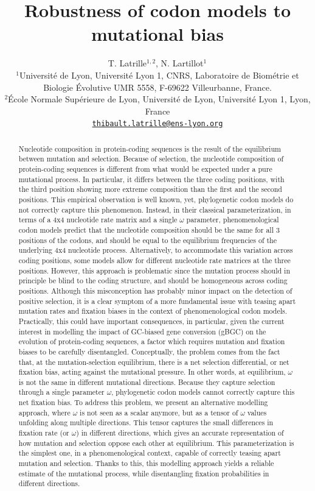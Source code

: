 \documentclass{article}
\title{Robustness of codon models to mutational bias}
\author{
    \large
    T. {Latrille}$^{1,2}$, N. {Lartillot}$^{1}$ \\
    \normalsize
	$^{1}$Université de Lyon, Université Lyon 1, CNRS, Laboratoire de Biométrie et Biologie Évolutive UMR 5558, F-69622 Villeurbanne, France.\\
	$^{2}$École Normale Supérieure de Lyon, Université de Lyon, Université Lyon 1, Lyon, France\\
	\texttt{\href{mailto:thibault.latrille@ens-lyon.org}{thibault.latrille@ens-lyon.org}} \\
}
\begin{document}
\maketitle

\begin{abstract}
    Nucleotide composition in protein-coding sequences is the result of the equilibrium between mutation and selection.
    Because of selection, the nucleotide composition of protein-coding sequences is different from what would be expected under a pure mutational process.
    In particular, it differs between the three coding positions, with the third position showing more extreme composition than the first and the second positions.
    This empirical observation is well known, yet, phylogenetic codon models do not correctly capture this phenomenon.
    Instead, in their classical parameterization, in terms of a 4x4 nucleotide rate matrix and a single $\omega$ parameter, phenomenological codon models predict that the nucleotide composition should be the same for all $3$ positions of the codons, and should be equal to the equilibrium frequencies of the underlying 4x4 nucleotide process.
    Alternatively, to accommodate this variation across coding positions, some models allow for different nucleotide rate matrices at the three positions.
    However, this approach is problematic since the mutation process should in principle be blind to the coding structure, and should be homogeneous across coding positions.
    Although this misconception has probably minor impact on the detection of positive selection, it is a clear symptom of a more fundamental issue with teasing apart mutation rates and fixation biases in the context of phenomenological codon models.
    Practically, this could have important consequences, in particular, given the current interest in modelling the impact of GC-biased gene conversion ({gBGC}) on the evolution of protein-coding sequences, a factor which requires mutation and fixation biases to be carefully disentangled.
    Conceptually, the problem comes from the fact that, at the mutation-selection equilibrium, there is a net selection differential, or net fixation bias, acting against the mutational pressure.
    In other words, at equilibrium, $\omega$ is not the same in different mutational directions.
    Because they capture selection through a single parameter $\omega$, phylogenetic codon models cannot correctly capture this net fixation bias.
    To address this problem, we present an alternative modelling approach, where $\omega$ is not seen as a scalar anymore, but as a tensor of $\omega$ values unfolding along multiple directions.
    This tensor captures the small differences in fixation rate (or $\omega$) in different directions, which gives an accurate representation of how mutation and selection oppose each other at equilibrium.
    This parameterization is the simplest one, in a phenomenological context, capable of correctly teasing apart mutation and selection.
    Thanks to this, this modelling approach yields a reliable estimate of the mutational process, while disentangling fixation probabilities in different directions.
\end{abstract}
\end{document}
